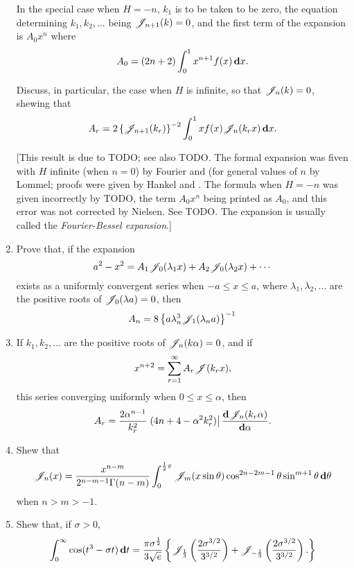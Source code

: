 \begin{enumerate}
  In the special case when $H = -n$, $k_{1}$ is to be taken to be
  zero, the equation determining $k_{1}, k_{2}, \ldots$ being
  $\mathscr{J}_{n+1}(k) = 0$, and the first term of the expansion is $A_{0}
  x^{n}$ where
  $$
  A_{0} = (2n+2) \int_{0}^{1} x^{n+1} f(x) \, \mathbf{d} x.
  $$

  Discuss, in particular, the case when $H$ is infinite, so that
  $\mathscr{J}_{n}(k)=0$, shewing that
  $$
  A_{r}
  =
  2 \left\{ \mathscr{J}_{n+1}(k_{r}) \right\}^{-2}
  \int_{0}^{1}
  x f(x) \mathscr{J}_{n}(k_{r}x)
  \, \mathbf{d} x.
  $$

  [This result is due to TODO; see also TODO. The formal expansion was
  fiven with $H$ infinite (when $n=0$) by Fourier and (for general
  values of $n$ by Lommel; proofs were given by Hankel and \Schlafli.
  The formula when $H = -n$ was given incorrectly by TODO, the term
  $A_{0}x^{n}$ being printed as $A_{0}$, and this error was not
  corrected by Nielsen. See TODO. The expansion is usually called the
  \emph{Fourier-Bessel expansion}.]
\item
  Prove that, if the expansion
  $$
  a^{2} - x^{2}
  =
  A_{1} \mathscr{J}_{0}(\lambda_{1} x)
  + A_{2} \mathscr{J}_{0}(\lambda_{2} x)
  + \cdots
  $$
  exists as a uniformly convergent series when
  $ -a \leq x \leq a$, where $\lambda_{1}, \lambda_{2}, \ldots$ are
  the positive roots of $\mathscr{J}_{0}(\lambda a)=0$, then
  $$
  A_{n} = 8 \left\{  a \lambda_{n}^{3} \mathscr{J}_{1}(\lambda_{n} a) \right\}^{-1}
  $$
%
%
\item
  If $k_{1}, k_{2}, \ldots$ are the positive roots of
  $\mathscr{J}_{n}(k\alpha) = 0$, and if
  $$
  x^{n+2} = \sum_{r=1}^{\infty} A_{r} \mathscr{J}(k_{r}x),
  $$
  this series converging uniformly when $0 \leq x \leq \alpha$, then
  $$
  A_{r}
  =
  \frac{2 \alpha^{n-1}}{k_{r}^{2}}
  \left.
    (4n + 4 - \alpha^{2}k_{r}^{2})
  \right|
  \frac{\mathbf{d} \mathscr{J}_{n}(k_{r}\alpha)}{\mathbf{d} \alpha}.
  $$
\item
  Shew that
  $$
  \mathscr{J}_{n}(x)
  =
  \frac{x^{n-m}}{2^{n-m-1}\Gamma(n-m)}
  \int_{0}^{\frac{1}{2} \pi}
  \mathscr{J}_{m}(x\sin\theta)
  \cos^{2n-2m-1}\theta
  \sin^{m+1}\theta
  \, \mathbf{d} \theta
  $$
  when $n>m>-1$.
\item
  Shew that, if $\sigma>0$,
  $$
  \int_{0}^{\infty}
  \cos(t^{3} - \sigma t) \, \mathbf{d} t
  =
  \frac{\pi \sigma^{\frac{1}{2}}}{3\sqrt{e}}
  \left\{ 
    \mathscr{J}_{\frac{1}{3}} \left( \frac{2 \sigma^{3/2}}{3^{3/2}} \right)
    +
    \mathscr{J}_{-\frac{1}{3}} \left( \frac{2 \sigma^{3/2}}{3^{3/2}} \right).
   \right\}
  $$

\end{enumerate}
